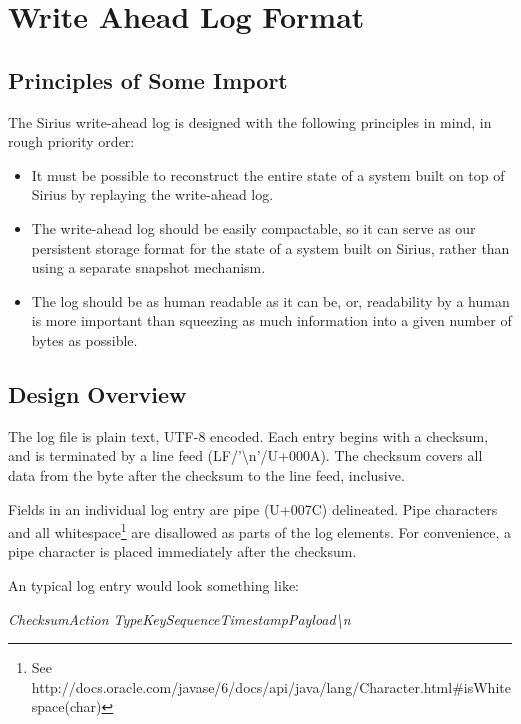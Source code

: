\documentclass[11pt]{article}
\begin{document}
\section{Write Ahead Log Format}

\subsection{Principles of Some Import}
The Sirius write-ahead log is designed with the following principles in mind, in rough priority order:

\begin{itemize}
\item It must be possible to reconstruct the entire state of a system built on top of Sirius by replaying the write-ahead log.
\item The write-ahead log should be easily compactable, so it can serve as our persistent storage format for the state of a system built on Sirius, rather than using a separate snapshot mechanism.
\item The log should be as human readable as it can be, or, readability by a human is more important than squeezing as much information into a given number of bytes as possible.
\end{itemize}


\subsection{Design Overview}

The log file is plain text, UTF-8 encoded.  Each entry begins with a checksum, and is terminated by a line feed (LF/'\textbackslash n'/U+000A). The checksum covers all data from the byte after the checksum to the line feed, inclusive.

Fields in an individual log entry are pipe (U+007C) delineated. Pipe characters and all whitespace\footnote{See http://docs.oracle.com/javase/6/docs/api/java/lang/Character.html\#isWhitespace(char)} are disallowed as parts of the log elements.  For convenience, a pipe character is placed immediately after the checksum.

An typical log entry would look something like:
\begin{center}
\em Checksum\textbar Action Type\textbar Key\textbar Sequence\textbar Timestamp\textbar Payload\textbackslash n
\end{center}
\end{document}
